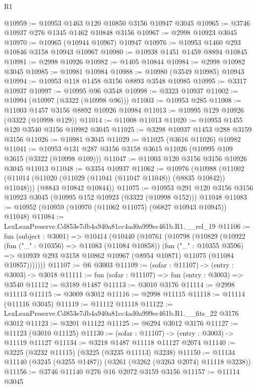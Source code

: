 \begin{lexlean}{R1}
\begin{coremodule}
@10959 := @10953 @1463 @120 @10850 @3156 @10947 @3045
@10965 := @3746 @10937 @276 @1345 @1462 @10848 @3156
@10967 := @2998 @10923 @3045
@10970 := @10965 (@10944 @10967) @10947
@10976 := @10953 @1460 @293 @10846 @3158 @10943 @10967
@10980 := @10938 @1451 @1459 @8894 @10845
@10981 := @2998 @10926
@10982 := @1405 @10844
@10984 := @2998 @10982 @3045
@10985 := @10981 @10984
@10988 := @10980 (@3549 @10985) @10943
@10994 := @10953 @118 @1458 @3156 @8893 @3548 @10985
@10995 := @3317 @10937
@10997 := @10995 @96 @3548
@10998 := @3323 @10937
@11002 := @10994 (@10997 (@3322 (@10998 @96)))
@11003 := @10953 @285
@11008 := @11003 @1457 @3156 @8892 @10926 @10984
@11013 := @10995 @129 @10926 (@3322 (@10998 @129))
@11014 := @11008 @11013
@11020 := @10953 @1455 @120 @3540 @3156 @10982 @3045
@11025 := @3298 @10937 @1453 @288 @3159 @3156
@11026 := @10981 @3045
@11029 := @11025 (@3616 @11026) @10982
@11041 := @10953 @131 @287 @3156 @3158 @3615 @11026 (@10995 @109 @3615 (@3322 (@10998 @109)))
@11047 := @11003 @120 @3156 @3156 @10926 @3045 @11013
@11048 := @3354 @10937
@11062 := @10976
    (@10988
      (@11002 (@11014 (@11020 (@11029 (@11041 (@11047 @11048)) (@8835 @10842)) @11048)))
      (@8843 @10842 @10844))
@11075 := @10953
    @291
    @120
    @3156
    @3156
    @10923
    @3045
    (@10995 @152 @10923 (@3322 (@10998 @152)))
    @11048
@11083 := @10952 (@10959 (@10970 (@11062 @11075) (@6827 @10943 @10945)) @11048)
@11084 := LexLeanPreserve.Cd853e7db4a940a81cc4ad0a999ec461b.R1.__rel_19
@11106 := fun (subject : @3001) =>
  @10414
    (@10440
      (@10761
        (@10798
          (@10829
            (@10922
              (fun ("_" : @10356) => @11083 (@11084 @10858))
              (fun ("_" : @10355 @3596) =>
              @10939 @293 @3158 @10862 @10967 (@8954 @10871) @11075 (@11084 @10857)))))))
@11107 := @6 @3003
@11109 := (sofar : @11107) -> (entry : @3003) -> @3018
@11111 := fun (sofar : @11107) => fun (entry : @3003) => @3540
@11112 := @3189 @1487
@11113 := @3010 @3176
@11114 := @2998 @11113
@11115 := @3009 @3012
@11116 := @2998 @11115
@11118 := @11114 (@11116 @3045)
@11119 := @11112 @11118
@11122 := LexLeanPreserve.Cd853e7db4a940a81cc4ad0a999ec461b.R1.__fits_22 @3176 @3012
@11123 := @3201 @11122
@11125 := @6294 @3012 @3176
@11127 := @11123 (@3010 @11125)
@11130 := (sofar : @11107) -> (entry : @3003) -> @11119 @11127
@11134 := @3218 @1487 @11118 @11127 @2074
@11140 := @3225 (@3232 @11115) (@3225 (@3235 @11113) @3238)
@11150 := @11134 @11140 (@3245 (@3255 @1487)) (@3261 (@3262 (@3263 @2074) @11118 @3238))
@11156 := @3746 @11140 @276 @16 @2072 @3159 @3156
@11157 := @11114 @3045

\end{coremodule}
\end{lexlean}
